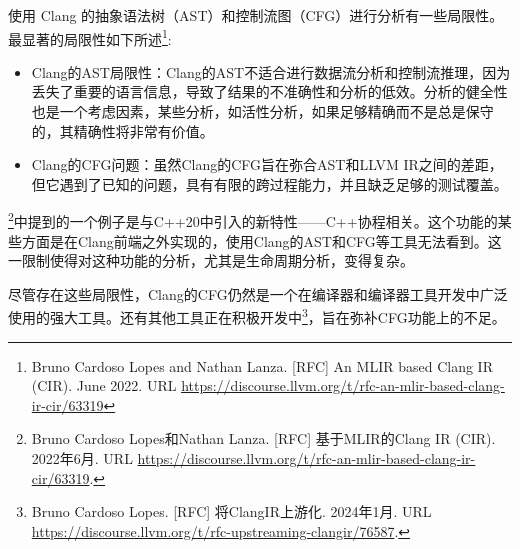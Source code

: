 
使用 Clang 的抽象语法树（AST）和控制流图（CFG）进行分析有一些局限性。最显著的局限性如下所述\footnote{Bruno Cardoso Lopes and Nathan Lanza. [RFC] An MLIR based Clang IR (CIR). June 2022. URL \url{https://discourse.llvm.org/t/rfc-an-mlir-based-clang-ir-cir/63319}}:


\begin{itemize}
\item
Clang的AST局限性：Clang的AST不适合进行数据流分析和控制流推理，因为丢失了重要的语言信息，导致了结果的不准确性和分析的低效。分析的健全性也是一个考虑因素，某些分析，如活性分析，如果足够精确而不是总是保守的，其精确性将非常有价值。

\item
Clang的CFG问题：虽然Clang的CFG旨在弥合AST和LLVM IR之间的差距，但它遇到了已知的问题，具有有限的跨过程能力，并且缺乏足够的测试覆盖。
\end{itemize}


\footnote{Bruno Cardoso Lopes和Nathan Lanza. [RFC] 基于MLIR的Clang IR (CIR). 2022年6月. URL \url{https://discourse.llvm.org/t/rfc-an-mlir-based-clang-ir-cir/63319}.}中提到的一个例子是与C++20中引入的新特性——C++协程相关。这个功能的某些方面是在Clang前端之外实现的，使用Clang的AST和CFG等工具无法看到。这一限制使得对这种功能的分析，尤其是生命周期分析，变得复杂。

尽管存在这些局限性，Clang的CFG仍然是一个在编译器和编译器工具开发中广泛使用的强大工具。还有其他工具正在积极开发中\footnote{Bruno Cardoso Lopes. [RFC] 将ClangIR上游化. 2024年1月. URL \url{https://discourse.llvm.org/t/rfc-upstreaming-clangir/76587}.}，旨在弥补CFG功能上的不足。

